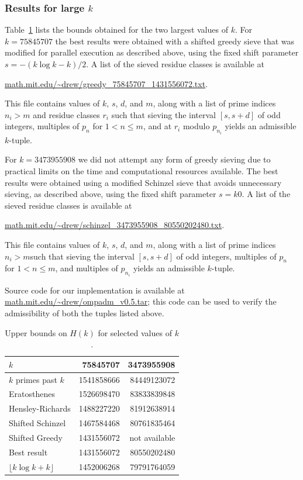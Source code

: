 \subsubsection{Results for large \texorpdfstring{$k$}{k}}

Table~\ref{klargetable} lists the bounds obtained for the two largest values of $k$.
For $k=\num{75845707}$ the best results were obtained with a shifted greedy sieve that was modified for parallel execution as described above, using the fixed shift parameter $s=-(k\log k-k)/2$.
A list of the sieved residue classes is available at
\begin{center}
 \url{math.mit.edu/~drew/greedy_75845707_1431556072.txt}.
\end{center}
This file contains values of $k$, $s$, $d$, and $m$, along with a list of prime indices $n_i> m$ and residue classes $r_i$ such that sieving the interval $[s,s+d]$ of odd integers, multiples of $p_n$ for $1<n \le m$, and at $r_i$ modulo $p_{n_i}$ yields an admissible $k$-tuple.

For $k=\num{3473955908}$ we did not attempt any form of greedy sieving due to practical limits on the time and computational resources available. The best results were obtained using a modified Schinzel sieve that avoids unnecessary sieving, as described above, using the fixed shift parameter $s=k0$.
A list of the sieved residue classes is available at
\begin{center}
 \url{math.mit.edu/~drew/schinzel_3473955908_80550202480.txt}.
\end{center}
This file contains values of $k$, $s$, $d$, and $m$, along with a list of prime indices $n_i> m$such that sieving the interval $[s,s+d]$ of odd integers, multiples of $p_n$ for $1<n \le m$, and multiples of $p_{n_i}$ yields an admissible $k$-tuple.

Source code for our implementation is available at \url{math.mit.edu/~drew/ompadm_v0.5.tar}; this code can be used to verify the admissibility of both the tuples listed above.

\begin{table}
\centering
\setlength{\extrarowheight}{2pt}
\caption{Upper bounds on $H(k)$ for selected values of $k$.}\label{klargetable}
\begin{tabular}{lrr}
\toprule
$k$                 & \num{75845707}   & \num{3473955908}  \\
\midrule
$k$ primes past $k$ & \num{1541858666} & \num{84449123072} \\
Eratosthenes        & \num{1526698470} & \num{83833839848} \\
Hensley-Richards    & \num{1488227220} & \num{81912638914} \\
Shifted Schinzel    & \num{1467584468} & \num{80761835464} \\
Shifted Greedy      & \num{1431556072} & not available\\
Best result         & \num{1431556072} & \num{80550202480} \\
\midrule
$\lfloor k\log k + k \rfloor$       & \num{1452006268}         & \num{79791764059} \\
\bottomrule
\end{tabular}
\end{table}

